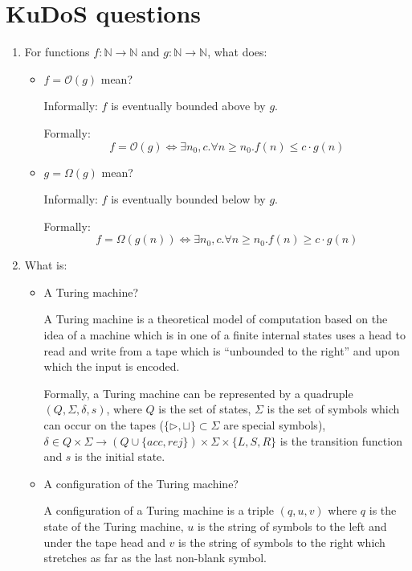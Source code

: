 \documentclass[10pt,\jkfside,a4paper]{article}
\begin{document}
\section{KuDoS questions}

\begin{enumerate}

\item For functions $f: \mathbb N \to \mathbb N$ and $g: \mathbb N \to
\mathbb N$, what does:

\begin{itemize}

\item $f = \mathcal O(g)$ mean?

Informally: $f$ is eventually bounded above by $g$.

Formally:
\[
f = \mathcal O(g)
\Longleftrightarrow
\exists n_0, c. \forall n \ge n_0. f(n) \le c \cdot g(n)
\]

\item $g = \Omega(g)$ mean?

Informally: $f$ is eventually bounded below by $g$.

Formally:
\[
f = \Omega(g(n))
\Longleftrightarrow
\exists n_0, c. \forall n \ge n_0. f(n) \ge c \cdot g(n)
\]

\end{itemize}

\item What is:

\begin{itemize}

\item A Turing machine?

A Turing machine is a theoretical model of computation based on the idea of
a machine which is in one of a finite internal states uses a head to
read and write from a tape which is ``unbounded to the right'' and upon
which the input is encoded.

Formally, a Turing machine can be represented by a quadruple
$(Q, \Sigma, \delta, s)$, where $Q$ is the set of states, $\Sigma$ is the
set of symbols which can occur on the tapes ($\{\triangleright, \sqcup\}
\subset \Sigma$ are special symbols), $\delta \in Q \times \Sigma \to (Q
\cup \{acc, rej\}) \times \Sigma \times \{L, S, R\}$ is the transition
function and $s$ is the initial state.

\item A configuration of the Turing machine?

A configuration of a Turing machine is a triple $(q, u, v)$ where $q$ is the
state of the Turing machine, $u$ is the string of symbols to the left and
under the tape head and $v$ is the string of symbols to the right which
stretches as far as the last non-blank symbol.


\end{itemize}
\end{enumerate}
\end{document}
